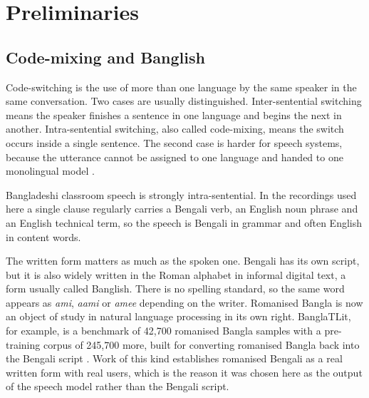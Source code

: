 
\section{Preliminaries}

\subsection{Code-mixing and Banglish}

Code-switching is the use of more than one language by the same speaker in the same
conversation. Two cases are usually distinguished. Inter-sentential switching means the
speaker finishes a sentence in one language and begins the next in another.
Intra-sentential switching, also called code-mixing, means the switch occurs inside a
single sentence. The second case is harder for speech systems, because the utterance
cannot be assigned to one language and handed to one monolingual model
\cite{agro2025cssurvey}.

Bangladeshi classroom speech is strongly intra-sentential. In the recordings used here a
single clause regularly carries a Bengali verb, an English noun phrase and an English
technical term, so the speech is Bengali in grammar and often English in content words.

The written form matters as much as the spoken one. Bengali has its own script, but it is
also widely written in the Roman alphabet in informal digital text, a form usually called
Banglish. There is no spelling standard, so the same word appears as \textit{ami},
\textit{aami} or \textit{amee} depending on the writer. Romanised Bangla is now an object
of study in natural language processing in its own right. BanglaTLit, for example, is a
benchmark of 42,700 romanised Bangla samples with a pre-training corpus of 245,700 more,
built for converting romanised Bangla back into the Bengali script
\cite{fahim2024banglatlit}. Work of this kind establishes romanised Bengali as a real
written form with real users, which is the reason it was chosen here as the output of the
speech model rather than the Bengali script.

